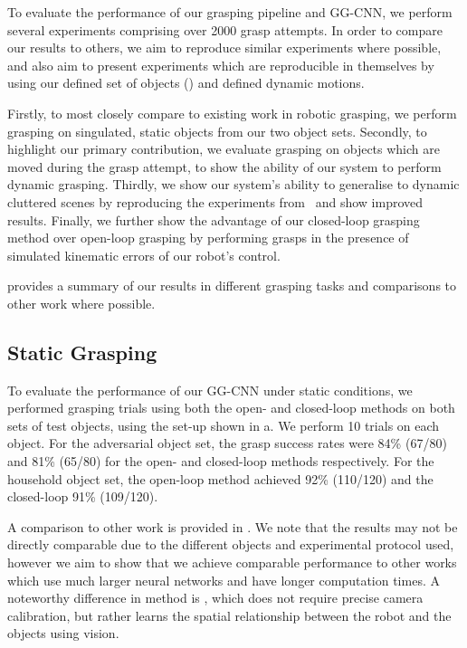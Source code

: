 \documentclass[conference]{IEEEtran}
\begin{document}
To evaluate the performance of our grasping pipeline and GG-CNN, we perform several experiments comprising over 2000 grasp attempts.  In order to compare our results to others, we aim to reproduce similar experiments where possible, and also aim to present experiments which are reproducible in themselves by using our defined set of objects () and defined dynamic motions.  

Firstly, to most closely compare to existing work in robotic grasping, we perform grasping on singulated, static objects from our two object sets.  Secondly, to highlight our primary contribution, we evaluate grasping on objects which are moved during the grasp attempt, to show the ability of our system to perform dynamic grasping.  Thirdly, we show our system's ability to generalise to dynamic cluttered scenes by reproducing the experiments from~\cite{Viereck2017LearningImages} and show improved results.  Finally, we further show the advantage of our closed-loop grasping method over open-loop grasping by performing grasps in the presence of simulated kinematic errors of our robot's control.  

 provides a summary of our results in different grasping tasks and comparisons to other work where possible.

\subsection{Static Grasping}
\label{sec:baseline}

To evaluate the performance of our GG-CNN under static conditions, we performed grasping trials using both the open- and closed-loop methods on both sets of test objects, using the set-up shown in a. We perform 10 trials on each object.  For the adversarial object set, the grasp success rates were 84\% (67/80) and 81\% (65/80) for the open- and closed-loop methods respectively.  For the household object set, the open-loop method achieved 92\% (110/120) and the closed-loop 91\% (109/120).  

A comparison to other work is provided in .  We note that the results may not be directly comparable due to the different objects and experimental protocol used, however we aim to show that we achieve comparable performance to other works which use much larger neural networks and have longer computation times. A noteworthy difference in method is \cite{Levine2017LearningCollection}, which does not require precise camera calibration, but rather learns the spatial relationship between the robot and the objects using vision.
\end{document}
